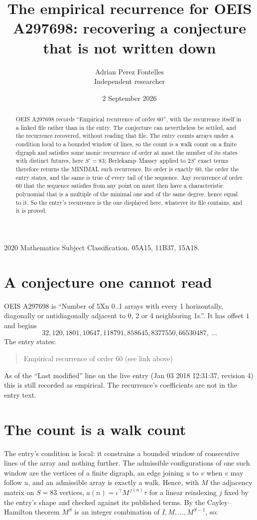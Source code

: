 \documentclass[11pt,a4paper]{article}
\title{The empirical recurrence for OEIS A297698: recovering a conjecture that is not written down}
\author{Adrian Perez Fontelles\\ \small Independent researcher}
\date{2 September 2026}
\theoremstyle{plain}
\theoremstyle{definition}
\begin{document}
\maketitle

\begin{abstract}
OEIS A297698 records ``Empirical recurrence of order $60$'', with the recurrence itself in a
linked file rather than in the entry. The conjecture can nevertheless be settled, and the
recurrence recovered, without reading that file. The entry counts arrays under a condition
local to a bounded window of lines, so the count is a walk count on a finite digraph and
satisfies some monic recurrence of order at most the number of its states with distinct
futures, here $S'=83$; Berlekamp--Massey applied to $2S'$ exact
terms therefore returns the MINIMAL such recurrence. Its order is exactly $60$, the order
the entry states, and the same is true of every tail of the sequence. Any recurrence of order
$60$ that the sequence satisfies from any point on must then have a characteristic
polynomial that is a multiple of the minimal one and of the same degree, hence equal to it. So
the entry's recurrence is the one displayed here, whatever its file contains, and it is
proved.
\end{abstract}

\noindent\small 2020 Mathematics Subject Classification. 05A15, 11B37, 15A18.\normalsize

\section{A conjecture one cannot read}

OEIS A297698 is ``Number of 5Xn 0..1 arrays with every 1 horizontally, diagonally or antidiagonally adjacent to 0, 2 or 4 neighboring 1s.''. It has offset $1$ and begins
\[
32, 120, 1801, 10647, 118791, 858645, 8377550, 66530487,\ \dots
\]
The entry states:
\begin{quote}
Empirical recurrence of order 60 (see link above)
\end{quote}
As of the ``Last modified'' line on the live entry (Jan 03 2018 12:31:37, revision 4) this is still
recorded as empirical. The recurrence's coefficients are not in the entry text.

\section{The count is a walk count}

The entry's condition is local: it constrains a bounded window of consecutive lines of the
array and nothing further. The admissible configurations of one such window are the vertices
of a finite digraph, an edge joining $u$ to $v$ when $v$ may follow $u$, and an admissible
array is exactly a walk. Hence, with $M$ the adjacency matrix on $S=83$ vertices,
$a(n)=\iota^{\!\top}M^{\,j(n)}\tau$ for a linear reindexing $j$ fixed by the entry's shape
and checked against its published terms. By the Cayley--Hamilton theorem $M^{S}$ is an
integer combination of $I,M,\dots,M^{S-1}$, so:
\end{document}
